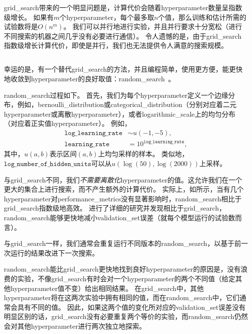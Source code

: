 \gls{grid_search}带来的一个明显问题是，计算代价会随着\gls{hyperparameter}数量呈指数级增长。
如果有$m$个\gls{hyperparameter}，每个最多取$n$个值，那么训练和估计所需的试验数将是$O(n^m)$。
我们可以并行地进行实验，并且并行要求十分宽松（进行不同搜索的机器之间几乎没有必要进行通信）。
令人遗憾的是，由于\gls{grid_search}指数级增长计算代价，即使是并行，我们也无法提供令人满意的搜索规模。


\subsection{}
\label{sec:random_search}
幸运的是，有一个替代\gls{grid_search}的方法，并且编程简单，使用更方便，能更快地收敛到\gls{hyperparameter}的良好取值：\gls{random_search}~\citep{Bergstra+Bengio-2012-small}。


\gls{random_search}过程如下。
首先，我们为每个\gls{hyperparameter}定义一个边缘分布，例如，\gls{bernoulli_distribution}或\gls{categorical_distribution}（分别对应着二元\gls{hyperparameter}或离散\gls{hyperparameter}），或者\gls{logarithmic_scale}上的均匀分布（对应着正实值\gls{hyperparameter}）。
例如，
\begin{align}
	\texttt{log\_learning\_rate} &\sim u(-1, -5), \\
	\texttt{learning\_rate} &= 10^{\texttt{log\_learning\_rate}},
\end{align}
其中，$u(a,b)$表示区间$(a,b)$上均匀采样的样本。
类似地，$\texttt{log\_number\_of\_hidden\_units}$可以从$u(\log(50), \log(2000))$上采样。


与\gls{grid_search}不同，我们\emph{不需要离散化}\gls{hyperparameter}的值。这允许我们在一个更大的集合上进行搜索，而不产生额外的计算代价。%
实际上，如所示，当有几个\gls{hyperparameter}对\gls{performance_metrics}没有显著影响时，\gls{random_search}相比于\gls{grid_search}指数级地高效。
\cite{Bergstra+Bengio-2012-small}进行了详细的研究并发现相比于\gls{grid_search}， \gls{random_search}能够更快地减小\gls{validation_set}误差（就每个模型运行的试验数而言）。

与\gls{grid_search}一样，我们通常会重复运行不同版本的\gls{random_search}，以基于前一次运行的结果改进下一次搜索。


\gls{random_search}能比\gls{grid_search}更快地找到良好\gls{hyperparameter}的原因是，没有浪费的实验，不像\gls{grid_search}有时会对一个\gls{hyperparameter}的两个不同值（给定其他\gls{hyperparameter}值不变）给出相同结果。
在\gls{grid_search}中，其他\gls{hyperparameter}将在这两次实验中拥有相同的值，而在\gls{random_search}中，它们通常会具有不同的值。
因此，如果这两个值的变化所对应的\gls{validation_set}误差没有明显区别的话，\gls{grid_search}没有必要重复两个等价的实验，而\gls{random_search}仍然会对其他\gls{hyperparameter}进行两次独立地探索。

